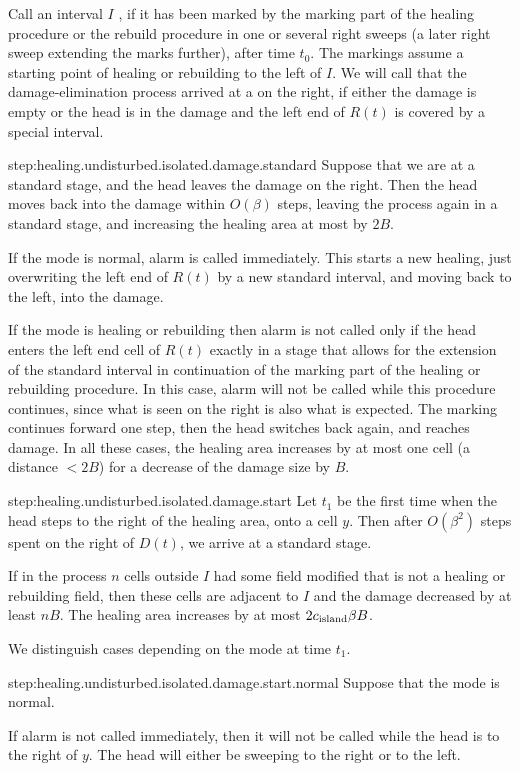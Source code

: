 \documentclass[12pt]{memoir}
\def\B{B}
\newcommand{\D}{D}
\newcommand{\R}{R}
\newcommand{\cns}[1]{c_{\textrm{\upshape #1}}}
\begin{document}
\begin{Proof}
Call an interval \( I \)  , if it has been marked
by the marking part of the healing procedure or the rebuild procedure
in one or several right sweeps (a later right sweep extending the marks further), 
after time \( t_{0} \).
The markings assume a starting point of healing or rebuilding to the left of \( I \).
We will call that the damage-elimination process arrived at a 
on the right, if either the damage is empty or the head is in the damage and
the left end of \( \R(t) \) is covered by a special interval.

\begin{step+}{step:healing.undisturbed.isolated.damage.standard}
Suppose that we are at a standard stage, and the head leaves the damage on the right.
Then the head moves back into the damage within \( O(\beta) \) steps,
leaving the process again in a standard stage, and increasing the healing area at most
by \( 2\B \).
\end{step+}
\begin{pproof}
If the mode is normal, alarm is called immediately.
This starts a new healing, just overwriting the left end of \( \R(t) \) 
by a new standard interval, and moving back to the left, into the damage.

If the mode is healing or rebuilding then alarm is not called only if the head enters the left 
end cell of \( \R(t) \)
exactly in a stage that allows for the extension of the standard interval in
continuation of the marking part of the healing or rebuilding procedure.
In this case, alarm will not be called while this procedure
continues, since what is seen on the right is also what is expected.
The marking continues forward one step, then the head switches back again, and
reaches damage.
In all these cases, the healing area increases by at most one cell (a distance \( <2\B \)) 
for a decrease of the damage size by \( \B \).
\end{pproof} %

\begin{step+}{step:healing.undisturbed.isolated.damage.start}
Let \( t_{1} \) be the first time when the head steps to the right of the healing area, 
onto a cell \( y \).
Then after \( O(\beta^{2}) \) steps spent on the right of \( \D(t) \),
we arrive at a standard stage.

If in the process \( n \) cells outside \( I \) had some field modified that is not a 
healing or rebuilding field, then these cells are adjacent to \( I \) and the damage
decreased by at least \( n\B \).
The healing area increases by at most \( 2\cns{island}\beta\B \).
\end{step+}
\begin{pproof}
We distinguish cases depending on the mode at time \( t_{1} \).
\begin{step+}{step:healing.undisturbed.isolated.damage.start.normal}
Suppose that the mode is normal.
\end{step+}
\begin{prooofi}
If alarm is not called immediately, 
then it will not be called while the head is to the right of \( y \).
The head will either be sweeping to the right or to the left.


\end{prooofi}
\end{pproof}
\end{Proof}
\end{document}
